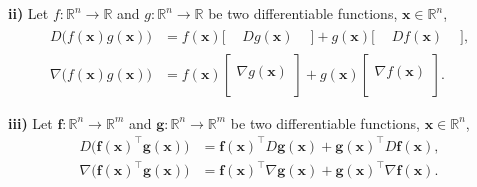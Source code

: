 \documentclass[12pt,thmsa]{article}
\begin{document}
\noindent
\textbf{ii)} Let \(f: \mathbb{R}^{n} \rightarrow \mathbb{R}\) and \(g: \mathbb{R}^{n} \rightarrow \mathbb{R}\) be two differentiable functions, \(\boldsymbol{x} \in \mathbb{R}^{n}\),
\[ 
\begin{aligned}
	D \bigg (f(\boldsymbol{x}) g(\boldsymbol{x}) \bigg )
	& = f(\boldsymbol{x}) \big [\begin{array}{ccc}
		&D g(\boldsymbol{x}) & \end{array} \big ] 
	+g(\boldsymbol{x}) \big [\begin{array}{ccc} & D f(\boldsymbol{x}) &
	\end{array} \big ], \\
	\nabla \bigg (f(\boldsymbol{x}) g(\boldsymbol{x}) \bigg )
	& = f(\boldsymbol{x}) \left [\begin{array}{c}
		\\ \nabla g(\boldsymbol{x}) \\  \\ \end{array} \right ] 
	+g(\boldsymbol{x}) \left [\begin{array}{c} \\ \nabla f(\boldsymbol{x}) \\ \\
	\end{array} \right ].
\end{aligned}
\]

\noindent
\textbf{iii)} Let \( \boldsymbol{f}: \mathbb{R}^{n} \rightarrow \mathbb{R}^{m}\) and \( \boldsymbol{g}: \mathbb{R}^{n} \rightarrow \mathbb{R}^{m}\) be two differentiable functions, \(\boldsymbol{x} \in \mathbb{R}^{n}\),
\[ 
\begin{aligned}
	D \bigg (\boldsymbol{f}(\boldsymbol{x})^{\top} \boldsymbol{g}(\boldsymbol{x}) \bigg )
	& =\boldsymbol{f}(\boldsymbol{x})^{\top} D \boldsymbol{g}(\boldsymbol{x})+\boldsymbol{g}(\boldsymbol{x})^{\top} D \boldsymbol{f}(\boldsymbol{x}), \\
	\nabla \bigg (\boldsymbol{f}(\boldsymbol{x})^{\top} \boldsymbol{g}(\boldsymbol{x}) \bigg )
	& =\boldsymbol{f}(\boldsymbol{x})^{\top} \nabla \boldsymbol{g}(\boldsymbol{x})+\boldsymbol{g}(\boldsymbol{x})^{\top} \nabla \boldsymbol{f}(\boldsymbol{x}). \\
\end{aligned}
\]
\end{document}
